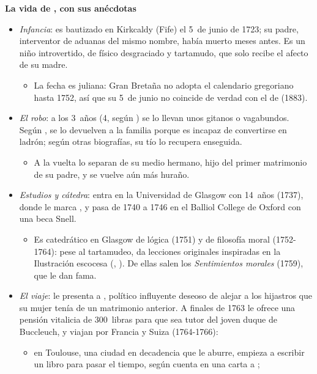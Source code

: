 \documentclass[11pt]{article}
\begin{document}
\begin{anotaciones}
\textbf{La vida de , con sus anécdotas}\nocite{Daniel2021Histoire,Otteson2026Smith,Glasgow2026Smith}
\begin{itemize}
\item \emph{Infancia}: es bautizado en Kirkcaldy (Fife) el 5~de junio de 1723; su padre, interventor de aduanas del mismo nombre, había muerto meses antes. Es un niño introvertido, de físico desgraciado y tartamudo, que solo recibe el afecto de su madre.
  \begin{itemize}
  \item La fecha es juliana: Gran Bretaña no adopta el calendario gregoriano hasta 1752\nocite{UK1750CalendarAct}, así que su 5~de junio no coincide de verdad con el de  (1883).
  \end{itemize}
\item \emph{El robo}: a los 3~años (4, según ) se lo llevan unos gitanos o vagabundos. Según , se lo devuelven a la familia porque es incapaz de convertirse en ladrón; según otras biografías, su tío lo recupera enseguida.
  \begin{itemize}
  \item A la vuelta lo separan de su medio hermano, hijo del primer matrimonio de su padre, y se vuelve aún más huraño.
  \end{itemize}
\item \emph{Estudios y cátedra}: entra en la Universidad de Glasgow con 14~años (1737), donde le marca , y pasa de 1740 a 1746 en el Balliol College de Oxford con una beca Snell.
  \begin{itemize}
  \item Es catedrático en Glasgow de lógica (1751) y de filosofía moral (1752-1764): pese al tartamudeo, da lecciones originales inspiradas en la Ilustración escocesa (, ). De ellas salen los \emph{Sentimientos morales} (1759), que le dan fama.
  \end{itemize}
\item \emph{El viaje}:  le presenta a , político influyente deseoso de alejar a los hijastros que su mujer tenía de un matrimonio anterior. A finales de 1763 le ofrece una pensión vitalicia de 300~libras para que sea tutor del joven duque de Buccleuch, y viajan por Francia y Suiza (1764-1766):
  \begin{itemize}
  \item en Toulouse, una ciudad en decadencia que le aburre, empieza a escribir un libro para pasar el tiempo, según cuenta en una carta a ;

\end{itemize}
\end{itemize}
\end{anotaciones}
\end{document}
